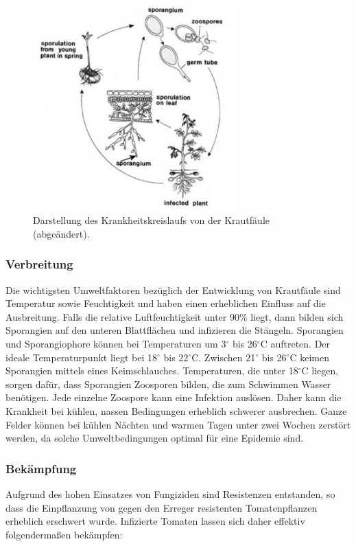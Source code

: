 \begin{figure}[h!]
	\centering
	\includegraphics[width=0.7\textwidth]{bilder/LateBlightdiscycle_sm.jpg}
	\caption{Darstellung des Krankheitskreislaufs von der Krautfäule\cite{lbopat} (abgeändert).}
	\label{diseasecircle_late}
\end{figure}

\subsubsection{Verbreitung}
Die wichtigsten Umweltfaktoren\cite{lbopat} bezüglich der Entwicklung von Krautfäule sind Temperatur sowie Feuchtigkeit und haben einen erheblichen Einfluss auf die Ausbreitung. Falls die relative Luftfeuchtigkeit unter 90\% liegt, dann bilden sich Sporangien auf den unteren Blattflächen und infizieren die Stängeln. Sporangien und Sporangiophore können bei Temperaturen um 3$^\circ$ bis 26$^\circ\text{C}$ auftreten. Der ideale Temperaturpunkt liegt bei 18$^\circ$ bis 22$^\circ\text{C}$. Zwischen 21$^\circ$ bis 26$^\circ\text{C}$ keimen Sporangien mittels eines Keimschlauches. Temperaturen, die unter 18$^\circ\text{C}$ liegen, sorgen dafür, dass Sporangien Zoosporen bilden, die zum Schwimmen Wasser benötigen. Jede einzelne Zoospore kann eine Infektion auslösen. Daher kann die Krankheit bei kühlen, nassen Bedingungen erheblich schwerer ausbrechen. Ganze Felder können bei kühlen Nächten und warmen Tagen unter zwei Wochen zerstört werden, da solche Umweltbedingungen optimal für eine Epidemie sind.



\subsubsection{Bekämpfung}
Aufgrund des hohen Einsatzes von Fungiziden\cite{rapid_detect} sind Resistenzen entstanden, so dass die Einpflanzung von gegen den Erreger resistenten Tomatenpflanzen erheblich erschwert wurde. Infizierte Tomaten lassen sich daher effektiv folgendermaßen bekämpfen\cite{lbopat}:

